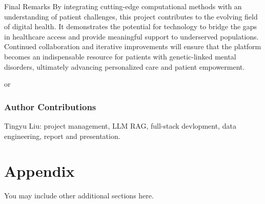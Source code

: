 \documentclass{article} %
\begin{document}
Final Remarks
By integrating cutting-edge computational methods with an understanding of patient challenges, this project contributes to the evolving field of digital health. It demonstrates the potential for technology to bridge the gaps in healthcare access and provide meaningful support to underserved populations. Continued collaboration and iterative improvements will ensure that the platform becomes an indispensable resource for patients with genetic-linked mental disorders, ultimately advancing personalized care and patient empowerment.



or %

\subsubsection*{Author Contributions}
Tingyu Liu: project management, LLM RAG, full-stack devlopment, data engineering, report and presentation.




\appendix
\section{Appendix}
You may include other additional sections here.
\end{document}
